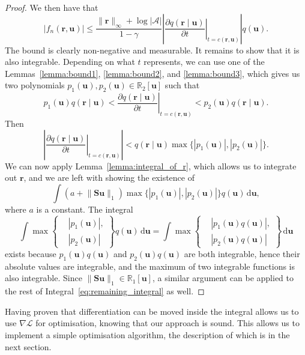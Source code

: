 \documentclass{mpaper}
\newcommand{\vbound}{\frac{\rinf + \log|\mathcal{A}|}{1 - \gamma}}
\newcommand{\rinf}{\lVert \mathbf{r} \rVert_\infty}
\newcommand{\fn}{f_n(\mathbf{r}, \mathbf{u})}
\begin{document}
\begin{proof}
  We then have that
  \[
    |\fn| \le \vbound \left| \left. \frac{\partial
          q(\mathbf{r} \mid \mathbf{u})}{\partial t} \right|_{t=c(\mathbf{r}, \mathbf{u})}
    \right| q(\mathbf{u}).
  \]
  The bound is clearly non-negative and measurable. It remains to show that it
  is also integrable. Depending on what $t$ represents, we can use one of the
  Lemmas~\ref{lemma:bound1}, \ref{lemma:bound2}, and \ref{lemma:bound3}, which
  gives us two polynomials $p_1(\mathbf{u}), p_2(\mathbf{u}) \in
  \mathbb{R}_2[\mathbf{u}]$ such that
  \[
    p_1(\mathbf{u})q(\mathbf{r} \mid \mathbf{u}) < \left. \frac{\partial q(\mathbf{r} \mid \mathbf{u})}{\partial
        t} \right|_{t=c(\mathbf{r}, \mathbf{u})} < p_2(\mathbf{u})q(\mathbf{r} \mid \mathbf{u}).
  \]
  Then
  \[
    \left| \left. \frac{\partial q(\mathbf{r} \mid \mathbf{u})}{\partial t}
      \right|_{t=c(\mathbf{r}, \mathbf{u})} \right| < q(\mathbf{r} \mid \mathbf{u}) \max \{
    |p_1(\mathbf{u})|, |p_2(\mathbf{u})| \}.
  \]
  We can now apply Lemma~\ref{lemma:integral_of_r}, which allows us to integrate
  out $\mathbf{r}$, and we are left with showing the existence of
  \begin{equation} \label{eq:remaining_integral}
    \int \left( a + \lVert \mathbf{Su} \rVert_1 \right) \max \{|p_1(\mathbf{u})|, |p_2(\mathbf{u})| \} q(\mathbf{u})\,\mathrm{d}\mathbf{u},
  \end{equation}
  where $a$ is a constant. The integral
  \[
    \int \max \left\{
      \begin{aligned}
        &|p_1(\mathbf{u})|, \\
        &|p_2(\mathbf{u})|
      \end{aligned}
    \right\} q(\mathbf{u})\,\mathrm{d}\mathbf{u} = \int \max \left\{
      \begin{aligned}
        &|p_1(\mathbf{u})q(\mathbf{u})|, \\
        &|p_2(\mathbf{u})q(\mathbf{u})|
      \end{aligned}
    \right\}\,\mathrm{d}\mathbf{u}
  \]
  exists because $p_1(\mathbf{u})q(\mathbf{u})$ and
  $p_2(\mathbf{u})q(\mathbf{u})$ are both integrable, hence their absolute
  values are integrable, and the maximum of two integrable functions is also
  integrable. Since $\lVert \mathbf{Su} \rVert_1 \in \mathbb{R}_1[\mathbf{u}]$,
  a similar argument can be applied to the rest of
  Integral~\eqref{eq:remaining_integral} as well.
\end{proof}

Having proven that differentiation can be moved inside the integral allows us to
use $\nabla\mathcal{L}$ for optimisation, knowing that our approach is sound.
This allows us to implement a simple optimisation algorithm, the description of
which is in the next section.
\end{document}
